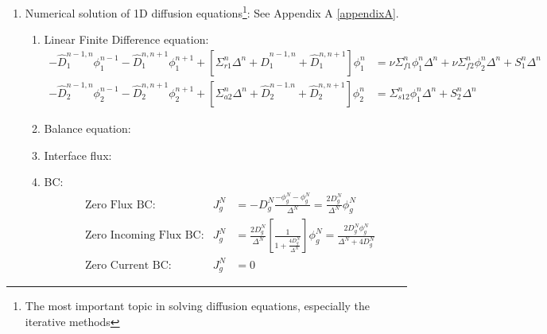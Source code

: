 \documentclass{school-22.211-notes}
\begin{document}
\begin{enumerate}
\item Numerical solution of 1D diffusion equations\footnote{The most important topic in solving diffusion equations, especially the iterative methods}: See Appendix A \ref{appendixA}.
\begin{enumerate}
\item Linear Finite Difference equation: 
  \begin{align*}
    - \hat{D}_1^{n-1,n} \phi_1^{n-1} - \hat{D}_1^{n,n+1} \phi_1^{n+1} + [ \Sigma_{r1}^n \Delta^n + \hat{D}_1^{n-1, n} + \hat{D}_1^{n,n+1} ] \phi_1^n 
    &= \nu \Sigma_{f1}^n \phi_1^n \Delta^n + \nu \Sigma_{f2}^n \phi_2^n \Delta^n + S_1^n \Delta^n \\
    - \hat{D}_2^{n-1,n} \phi_2^{n-1} - \hat{D}_2^{n,n+1} \phi_2^{n+1} + [\Sigma_{a2}^n \Delta^n + \hat{D}_2^{n-1.n} + \hat{D}_2^{n,n+1} ] \phi_2^n 
    &= \Sigma_{s12}^n \phi_1^n \Delta^n + S_2^n \Delta^n 
  \end{align*}

\item Balance equation: 

\item Interface flux: 
\item BC: 
  \begin{align}
    &\mbox{Zero Flux BC:} & J_g^N &= -D_g^N \frac{ -\phi_g^N - \phi_g^N}{\Delta^N}  = \frac{2 D_g^N}{\Delta^N} \phi_g^N \\
    &\mbox{Zero Incoming Flux BC:} & J_g^N &= \frac{2D_g^N}{\Delta^N} \left[ \frac{1}{1 + \frac{4 D_g^N}{\Delta^N}} \right] \phi_g^N = \frac{2D_g^N \phi_g^N}{\Delta^N + 4 D_g^N}  \\
    &\mbox{Zero Current BC:} & J_g^N &= 0 
  \end{align}



\end{enumerate}
\end{enumerate}
\end{document}
